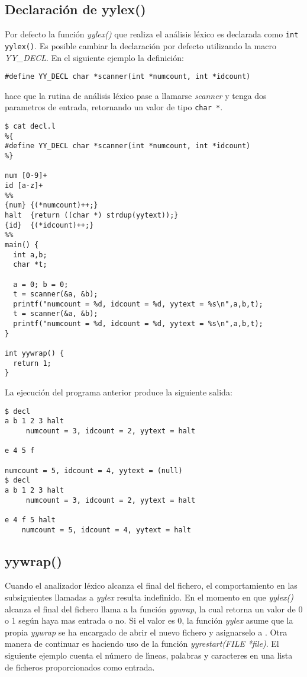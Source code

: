 \subsection{Declaraci\'on de yylex()}
\label{section:yylexdec}
Por defecto la funci\'on \emph{yylex()} que realiza el an\'alisis l\'exico es
declarada como  \verb|int yylex()|. Es posible cambiar la declaraci\'on
por defecto utilizando la macro \emph{YY\_DECL}. En el siguiente ejemplo
la definici\'on:
\begin{verbatim}
#define YY_DECL char *scanner(int *numcount, int *idcount)
\end{verbatim}
hace que la rutina de an\'alisis l\'exico pase a llamarse 
\emph{scanner} y tenga dos parametros de entrada, retornando
un valor de tipo \verb|char *|.
\begin{verbatim}
$ cat decl.l
%{
#define YY_DECL char *scanner(int *numcount, int *idcount)
%}
 
num [0-9]+
id [a-z]+
%%
{num} {(*numcount)++;}
halt  {return ((char *) strdup(yytext));}
{id}  {(*idcount)++;}
%%
main() {
  int a,b;
  char *t;
 
  a = 0; b = 0;
  t = scanner(&a, &b);
  printf("numcount = %d, idcount = %d, yytext = %s\n",a,b,t);
  t = scanner(&a, &b);
  printf("numcount = %d, idcount = %d, yytext = %s\n",a,b,t);
}
 
int yywrap() {
  return 1;
}                                
\end{verbatim}
La ejecuci\'on del programa anterior produce la siguiente salida:
\begin{verbatim}
$ decl
a b 1 2 3 halt
     numcount = 3, idcount = 2, yytext = halt
 
e 4 5 f
 
numcount = 5, idcount = 4, yytext = (null)
$ decl
a b 1 2 3 halt
     numcount = 3, idcount = 2, yytext = halt
 
e 4 f 5 halt
    numcount = 5, idcount = 4, yytext = halt     
\end{verbatim}

\subsection{yywrap()}
Cuando el analizador l\'exico alcanza el final del fichero, el
comportamiento en las subsiguientes llamadas a \emph{yylex}
resulta indefinido.  En el momento en que  \emph{yylex()}
alcanza el final del fichero llama a la funci\'on \emph{yywrap}, la cual retorna un
valor de 0 o 1 seg\'un haya mas entrada o no. Si el valor es 0,
la funci\'on \emph{yylex} asume que la propia \emph{yywrap}
se ha encargado de abrir el nuevo fichero y asignarselo
a .  Otra manera de continuar es haciendo uso de
la funci\'on \emph{yyrestart(FILE *file)}. 
El siguiente ejemplo cuenta el n\'umero de l\'{\i}neas, palabras y
caracteres en una lista de ficheros proporcionados como entrada.

